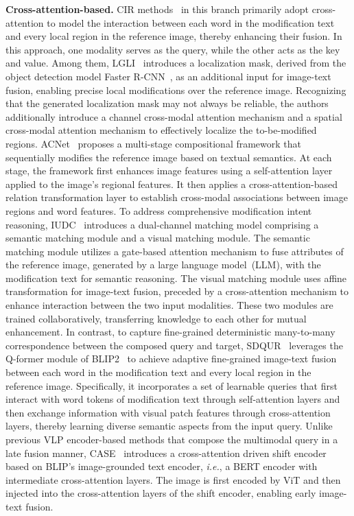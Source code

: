 \textbf{Cross-attention-based.} 
CIR methods~\cite{hosseinzadeh2020lbf, dodds2020maaf, xu2023ComqueryFormer, huang2023lgli, li2023acnet, ge2024iudc, hu2023provla} in this branch primarily adopt cross-attention to model the interaction between each word in the modification text and every local region in the reference image, thereby enhancing their fusion. In this approach, one modality serves as the query, while the other acts as the key and value. Among them, LGLI~\cite{huang2023lgli} introduces a localization mask, derived from the object detection model Faster R-CNN~\cite{RenHG2017}, as an additional input for image-text fusion, enabling precise local modifications over the reference image. 
Recognizing that the generated localization mask may not always be reliable, the authors additionally introduce a channel cross-modal attention mechanism and a spatial cross-modal attention mechanism to effectively localize the to-be-modified regions. 
ACNet~\cite{li2023acnet} proposes a multi-stage compositional framework that sequentially modifies the reference image based on textual semantics. At each stage, the framework first enhances image features using a self-attention layer applied to the image's regional features. It then applies a cross-attention-based relation transformation layer to establish cross-modal associations between image regions and word features.
To address comprehensive modification intent reasoning, IUDC~\cite{ge2024iudc} introduces a dual-channel matching model comprising a semantic matching module and a visual matching module. The semantic matching module utilizes a gate-based attention mechanism to fuse attributes of the reference image, generated by a large language model~(LLM), with the modification text for semantic reasoning. The visual matching module uses affine transformation for image-text fusion, preceded by a cross-attention mechanism to enhance interaction between the two input modalities. These two modules are trained collaboratively, transferring knowledge to each other for mutual enhancement.
In contrast, to capture fine-grained deterministic many-to-many correspondence between the composed query and target, 
SDQUR~\cite{xu2024SDQUR} leverages the Q-former module of BLIP2~\cite{li2023blip2} to achieve adaptive fine-grained image-text fusion between each word in the modification text and every local region in the reference image. Specifically, it incorporates a set of learnable queries that first interact with word tokens of modification text through self-attention layers and then exchange information with visual patch features through cross-attention layers, thereby learning diverse semantic aspects from the input query.
Unlike previous VLP encoder-based methods that compose the multimodal query in a late fusion manner, CASE~\cite{levy2024case} introduces a cross-attention driven shift encoder based on BLIP's image-grounded text encoder, \textit{i.e.}, a BERT encoder with intermediate cross-attention layers. The image is first encoded by ViT and then injected into the cross-attention layers of the shift encoder, enabling early image-text fusion. 


